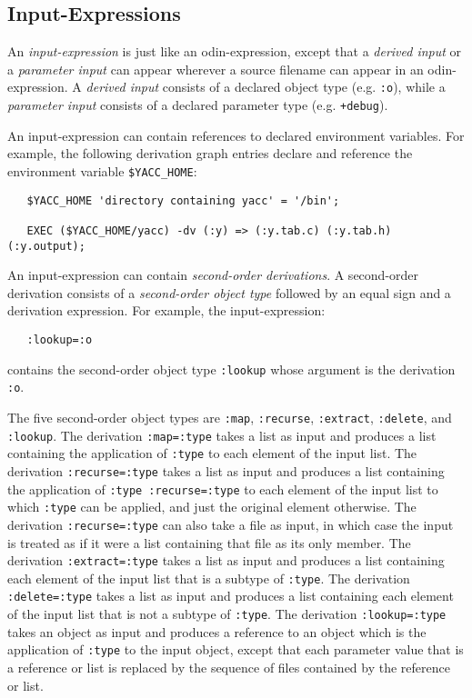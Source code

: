 \documentclass[hidelinks]{report}
\newcommand{\ex}{\tt}   %
\begin{document}
\subsection{Input-Expressions}
\label{input}

An {\em input-expression} is just like an odin-expression,
except that a {\em derived input} or a {\em parameter input}
can appear wherever a source filename can appear in an odin-expression.
A {\em derived input} consists of a declared object type (e.g. {\ex :o}),
while a {\em parameter input} consists of a declared parameter type
(e.g. {\ex +debug}).

An input-expression can contain references to
declared environment variables.
For example, the following derivation graph entries declare
and reference the environment variable {\ex \$YACC\_HOME}:
\begin{verbatim}
   $YACC_HOME 'directory containing yacc' = '/bin';

   EXEC ($YACC_HOME/yacc) -dv (:y) => (:y.tab.c) (:y.tab.h) (:y.output);
\end{verbatim}

An input-expression can contain {\em second-order derivations}.
A second-order derivation consists of a
{\em second-order object type} followed by an equal sign
and a derivation expression.
For example, the input-expression:
\begin{verbatim}
   :lookup=:o
\end{verbatim}
contains the second-order object type {\ex :lookup} whose
argument is the derivation {\ex :o}.

The five second-order object types are {\ex :map}, {\ex :recurse},
{\ex :extract}, {\ex :delete}, and {\ex :lookup}.
The derivation {\ex :map=:type} takes a list as input and produces
a list containing the application of {\ex :type}
to each element of the input list.
The derivation {\ex :recurse=:type} takes a list
as input and produces a list containing the application of
{\ex :type :recurse=:type} to each element of the input list
to which {\ex :type} can be applied, and just the original
element otherwise.  The derivation {\ex :recurse=:type} can
also take a file as input, in which case the input is treated as
if it were a list containing that file as its only member.
The derivation {\ex :extract=:type} takes a list as input and produces a list
containing each element of the input list that is a subtype of {\ex :type}.
The derivation {\ex :delete=:type} takes a list as input and produces a list
containing each element of the input list that is not a subtype of {\ex :type}.
The derivation {\ex :lookup=:type} takes an object as input and
produces a reference to an object
which is the application of {\ex :type} to the input object,
except that each parameter value that is a reference or list
is replaced by the sequence of files contained by the reference
or list.
\end{document}
